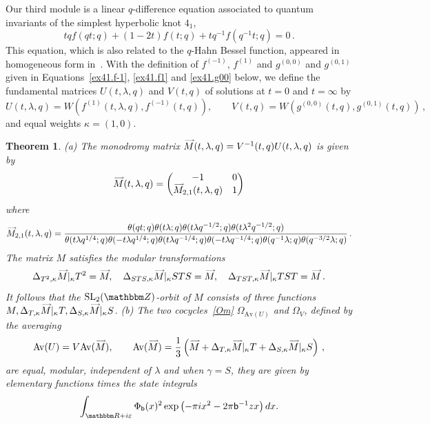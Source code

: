 \documentclass[12pt,reqno]{amsart}
\newtheorem{theorem}{Theorem}[section]
\theoremstyle{definition}
\def\BZ{\mathbbm Z}
\def\BR{\mathbbm R}
\def\SL{\mathrm{SL}}
\def\tq{\tilde{q}}
\def\ve{\varepsilon}
\def\be{\begin{equation}}
\def\ee{\end{equation}}
\def\sfb{\mathsf{b}}
\def\e{\bold e}
\def\Av{\mathrm{Av}}
\def\Om{\Omega}
\def\vM{\accentset{\longrightarrow}{M}}
\def\sfb{\mathsf{b}}
\begin{document}
Our third module is a linear $q$-difference equation associated to quantum
invariants of the simplest hyperbolic  knot $4_1$,
\be
\label{41x1}
tqf(qt;q) +(1-2t)f(t;q)+ tq^{-1}f(q^{-1}t;q) = 0 \,.
\ee
This equation, which is also related to the $q$-Hahn Bessel function, appeared
in homogeneous form in~\cite[Eqn.(11)]{GGM}. 
With the definition of $f^{(-1)}$, $f^{(1)}$ and $g^{(0,0)}$ and $g^{(0,1)}$ given in
Equations~\eqref{ex41.f-1}, \eqref{ex41.f1} and \eqref{ex41.g00}
below, we define the fundamental matrices $U(t,\lambda,q)$ and $V(t,q)$
of solutions at $t=0$ and $t=\infty$ by 
\be
\label{UVex41}
U(t,\lambda,q) = W(f^{(1)}(t,\lambda,q), f^{(-1)}(t,q)), \qquad
V(t,q) = W(g^{(0,0)}(t,q), g^{(0,1)}(t,q)) \,,
\ee
and equal weights $\kappa=(1,0)$.
\begin{theorem}
  \label{thm.41}
{\rm (a)}
The monodromy matrix $\vM(t,\lambda,q)=V^{-1}(t,q)U(t,\lambda,q)$ is given by
\be
\label{M41b}
\vM(t,\lambda,q) =
\begin{pmatrix}
- 1 & 0\\
\vM_{2,1}(t,\lambda,q) & 1\\
\end{pmatrix}
\ee
where 
\be
\label{M412}
\vM_{2,1}(t,\lambda,q) =
\frac{\theta(qt;q)\theta(t\lambda;q)\theta(t\lambda q^{-1/2};q)
\theta(t\lambda^{2}q^{-1/2};q)}{\theta(t\lambda q^{1/4};q)
\theta(-t\lambda q^{1/4};q)\theta(t\lambda q^{-1/4};q)
\theta(-t\lambda q^{-1/4};q)\theta(q^{-1}\lambda;q)\theta(q^{-3/2}\lambda;q)} \,.
\ee
The matrix $M$ satisfies the modular transformations
\be
\label{M41c}
\Delta_{T^{2},\kappa}\vM|_{\kappa}T^2=\vM,\quad
\Delta_{STS,\kappa}\vM|_{\kappa}STS=\vM,\quad
\Delta_{TST,\kappa}\vM|_{\kappa}TST=\vM\,.
\ee
It follows that the $\SL_2(\BZ)$-orbit of $M$ consists
of three functions $M,\Delta_{T,\kappa}\vM|_{\kappa}T,\Delta_{S,\kappa}\vM|_{\kappa}S$.
\newline
{\rm (b)}
The two cocycles~\eqref{Om} $\Om_{\Av(U)}$ and $\Om_{V}$, defined by the averaging 
\be
\Av(U)=V\Av(\vM), \qquad \Av(\vM)=
\frac{1}{3}\left(\vM+\Delta_{T,\kappa}\vM|_{\kappa}T
  +\Delta_{S,\kappa}\vM|_{\kappa}S\right) \,,
\ee
are equal, modular, independent of $\lambda$ and when $\gamma=S$, they
are given by elementary functions times the state integrals
\be
\int_{\BR+i\ve}
\Phi_{\sfb}(x)^2
\exp\left(-\pi i x^{2}-2\pi\sfb^{-1}zx\right)dx.
\ee
\end{theorem}
\end{document}
